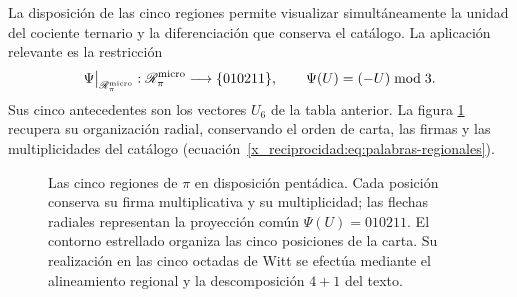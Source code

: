 La disposición de las cinco regiones permite visualizar simultáneamente
la unidad del cociente ternario y la diferenciación que conserva el
catálogo. La aplicación relevante es la restricción
\[
 \Psi\big|_{\mathscr R_\pi^{\rm micro}}:
 \mathscr R_\pi^{\rm micro}\longrightarrow\{010211\},
 \qquad \Psi(U)=(-U)\bmod3.
\]
Sus cinco antecedentes son los vectores \(U_6\) de la tabla anterior.
La figura \ref{x_reciprocidad:pi-estrella:figura} recupera su organización radial,
conservando el orden de carta, las firmas y las multiplicidades del
catálogo (ecuación~\eqref{x_reciprocidad:eq:palabras-regionales}).


\begin{figure}[H]
\centering
{}
\caption{Las cinco regiones de \(\pi\) en disposición pentádica.
Cada posición conserva su firma multiplicativa y su multiplicidad;
las flechas radiales representan la proyección común
\(\Psi(U)=010211\). El contorno estrellado organiza las cinco
posiciones de la carta. Su realización en las cinco octadas de Witt
se efectúa mediante el alineamiento regional y la descomposición
\(4+1\) del texto.}
\label{x_reciprocidad:pi-estrella:figura}
\end{figure}

